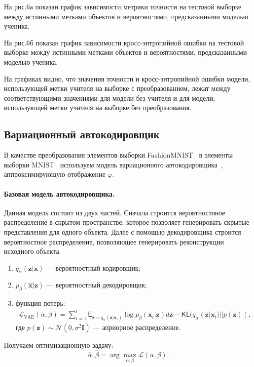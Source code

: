 На рис.6а показан график зависимости метрики точности на тестовой выборке между истинными метками объектов и вероятностями, предсказанными моделью ученика.

На рис.6б показан график зависимости кросс-энтропийной ошибки на тестовой выборке между истинными метками объектов и вероятностями, предсказанными моделью ученика.

На графиках видно, что значения точности и кросс-энтропийной ошибки модели, использующей метки учителя на выборке с преобразованием, лежат между соответствующими значениями для модели без учителя и для модели, использующей метки учителя на выборке без преобразования.

\subsection{Вариационный автокодировщик}

В качестве преобразования элементов выборки FashionMNIST~\cite{FMNIST} в элементы выборки MNIST~\cite{MNIST} используем модель вариационного автокодировщика~\cite{VAE}, аппроксимирующую отображение $\varphi$.
\paragraph{Базовая модель автокодировщика.} Данная модель состоит из двух частей. Сначала строится вероятностоное распределение в скрытом пространстве, которое позволяет генерировать скрытые представления для одного объекта. Далее с помощью декодировщика строится вероятностное распределение, позволяющее генерировать реконструкции исходного объекта.
\begin{enumerate}
    \item $q_{\alpha}(\mathbf{z}|\mathbf{x})$ --- вероятностный кодировщик;
    \item $p_{\beta}(\hat{\mathbf{x}}|\mathbf{z})$ --- вероятностный декодировщик;
    \item функция потерь:
    \[
    \begin{aligned}
    \mathcal{L}_{\text{VAE}}(\alpha, \beta)=\sum\limits_{i=1}^{l}\mathsf{E}_{\mathbf{z}\sim q_{\alpha}(\mathbf{z}|\mathbf{x}_{i})}\log{p_{\beta}(\mathbf{x}_{i}|\mathbf{z})} d \mathbf{z}-\mathsf{KL}(q_{\alpha}(\mathbf{z}|\mathbf{x}_{i}) || p(\mathbf{z})),
    \end{aligned}
    \]
    где
    $p(\mathbf{z})\sim \mathcal{N}(0,\sigma^{2}\mathbf{I})$ 
    --- априорное распределение.
\end{enumerate}
Получаем оптимизационную задачу:
$$\hat{\alpha}, \hat{\beta} = \arg\max_{\alpha, \beta} \mathcal{L}(\alpha, \beta).$$

